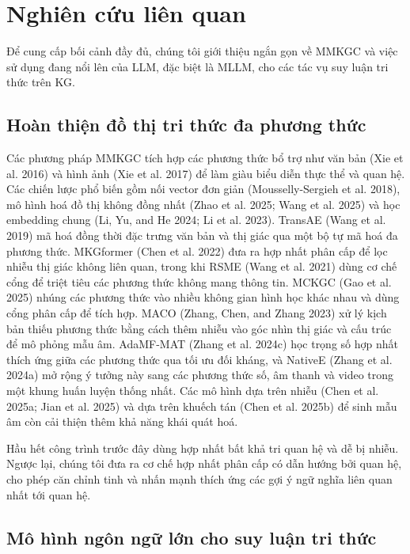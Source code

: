 \documentclass[10pt,twocolumn,a4paper]{article}
\begin{document}
\section{Nghiên cứu liên quan}

Để cung cấp bối cảnh đầy đủ, chúng tôi giới thiệu ngắn gọn về MMKGC và việc sử dụng đang nổi lên của LLM, đặc biệt là MLLM, cho các tác vụ suy luận tri thức trên KG.

\subsection{Hoàn thiện đồ thị tri thức đa phương thức}

Các phương pháp MMKGC tích hợp các phương thức bổ trợ như văn bản (Xie et al. 2016) và hình ảnh (Xie et al. 2017) để làm giàu biểu diễn thực thể và quan hệ. Các chiến lược phổ biến gồm nối vector đơn giản (Mousselly-Sergieh et al. 2018), mô hình hoá đồ thị không đồng nhất (Zhao et al. 2025; Wang et al. 2025) và học embedding chung (Li, Yu, and He 2024; Li et al. 2023). TransAE (Wang et al. 2019) mã hoá đồng thời đặc trưng văn bản và thị giác qua một bộ tự mã hoá đa phương thức. MKGformer (Chen et al. 2022) đưa ra hợp nhất phân cấp để lọc nhiễu thị giác không liên quan, trong khi RSME (Wang et al. 2021) dùng cơ chế cổng để triệt tiêu các phương thức không mang thông tin. MCKGC (Gao et al. 2025) nhúng các phương thức vào nhiều không gian hình học khác nhau và dùng cổng phân cấp để tích hợp. MACO (Zhang, Chen, and Zhang 2023) xử lý kịch bản thiếu phương thức bằng cách thêm nhiễu vào góc nhìn thị giác và cấu trúc để mô phỏng mẫu âm. AdaMF-MAT (Zhang et al. 2024c) học trọng số hợp nhất thích ứng giữa các phương thức qua tối ưu đối kháng, và NativeE (Zhang et al. 2024a) mở rộng ý tưởng này sang các phương thức số, âm thanh và video trong một khung huấn luyện thống nhất. Các mô hình dựa trên nhiễu (Chen et al. 2025a; Jian et al. 2025) và dựa trên khuếch tán (Chen et al. 2025b) để sinh mẫu âm còn cải thiện thêm khả năng khái quát hoá.

Hầu hết công trình trước đây dùng hợp nhất bất khả tri quan hệ và dễ bị nhiễu. Ngược lại, chúng tôi đưa ra cơ chế hợp nhất phân cấp có dẫn hướng bởi quan hệ, cho phép căn chỉnh tinh và nhấn mạnh thích ứng các gợi ý ngữ nghĩa liên quan nhất tới quan hệ.

\subsection{Mô hình ngôn ngữ lớn cho suy luận tri thức}
\end{document}
